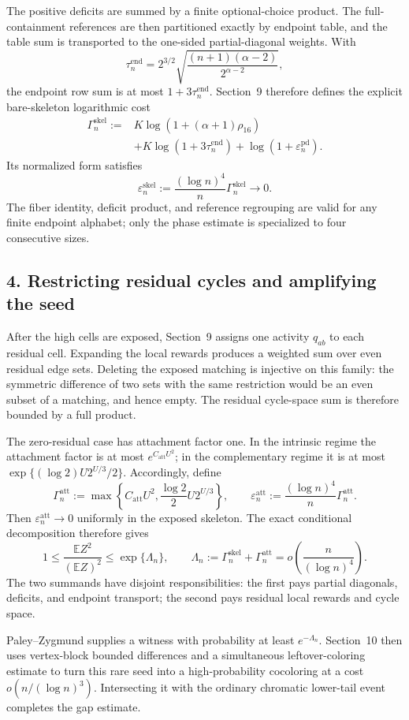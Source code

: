 The positive deficits are summed by a finite optional-choice product. The
full-containment references are then partitioned exactly by endpoint table,
and the table sum is transported to the one-sided partial-diagonal weights.
With
\[
  \tau_n^{\mathrm{end}}
  =2^{3/2}\sqrt{\frac{(n+1)(\alpha-2)}{2^{\alpha-2}}},
\]
the endpoint row sum is at most $1+3\tau_n^{\mathrm{end}}$. Section~9 therefore
defines the explicit bare-skeleton logarithmic cost
\[
\begin{split}
  \Gamma_n^{\mathrm{skel}}
  :={}&K\log\!\left(1+(\alpha+1)\rho_{16}\right)\\
      &+K\log\!\left(1+3\tau_n^{\mathrm{end}}\right)
       +\log\!\left(1+\varepsilon_n^{\mathrm{pd}}\right).
\end{split}
\]
Its normalized form satisfies
\[
  \varepsilon_n^{\mathrm{skel}}
  :=\frac{(\log n)^4}{n}\Gamma_n^{\mathrm{skel}}
  \longrightarrow0.
\]
The fiber identity, deficit product, and reference regrouping are valid for any
finite endpoint alphabet; only the phase estimate is specialized to four
consecutive sizes.

\subsection*{4. Restricting residual cycles and amplifying the seed}

After the high cells are exposed, Section~9 assigns one activity $q_{ab}$ to
each residual cell. Expanding the local rewards produces a weighted sum over
even residual edge sets. Deleting the exposed matching is injective on this
family: the symmetric difference of two sets with the same restriction would
be an even subset of a matching, and hence empty. The residual cycle-space sum
is therefore bounded by a full product.

The zero-residual case has attachment factor one. In the intrinsic regime the
attachment factor is at most $e^{C_{\mathrm{att}}U^2}$; in the complementary
regime it is at most
$\exp\{(\log 2)U2^{U/3}/2\}$. Accordingly, define
\[
  \Gamma_n^{\mathrm{att}}
  :=\max\!\left\{
      C_{\mathrm{att}}U^2,
      \frac{\log 2}{2}U2^{U/3}
    \right\},
  \qquad
  \varepsilon_n^{\mathrm{att}}
  :=\frac{(\log n)^4}{n}\Gamma_n^{\mathrm{att}}.
\]
Then $\varepsilon_n^{\mathrm{att}}\to0$ uniformly in the exposed skeleton.
The exact conditional decomposition therefore gives
\[
  1
  \le
  \frac{\mathbb E Z^2}{(\mathbb E Z)^2}
  \le
  \exp\{\Lambda_n\},
  \qquad
  \Lambda_n
  :=\Gamma_n^{\mathrm{skel}}+\Gamma_n^{\mathrm{att}}
  =o\!\left(\frac{n}{(\log n)^4}\right).
\]
The two summands have disjoint responsibilities: the first pays partial
diagonals, deficits, and endpoint transport; the second pays residual local
rewards and cycle space.

Paley--Zygmund supplies a witness with probability at least $e^{-\Lambda_n}$.
Section~10 then uses vertex-block bounded differences and a simultaneous
leftover-coloring estimate to turn this rare seed into a high-probability
cocoloring at a cost $o(n/(\log n)^3)$. Intersecting it with the ordinary
chromatic lower-tail event completes the gap estimate.